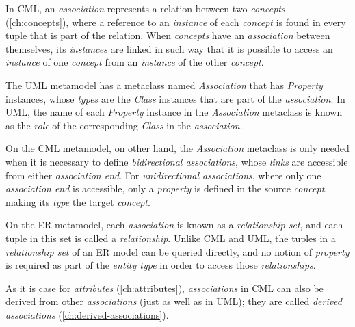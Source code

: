 In CML,
an \emph{association} represents a relation between two \emph{concepts} (\ref{ch:concepts}),
where a reference to an \emph{instance} of each \emph{concept} is found in every tuple that is part of the relation.
When \emph{concepts} have an \emph{association} between themselves,
its \emph{instances} are linked in such way that
it is possible to access an \emph{instance} of one \emph{concept}
from an \emph{instance} of the other \emph{concept}.

The UML \cite{uml} metamodel has a metaclass named \emph{Association} that has \emph{Property} instances,
whose \emph{types} are the \emph{Class} instances that are part of the \emph{association}.
In UML, the name of each \emph{Property} instance in the \emph{Association} metaclass
is known as the \emph{role} of the corresponding \emph{Class} in the \emph{association}.

On the CML metamodel, on other hand,
the \emph{Association} metaclass is only needed
when it is necessary to define \emph{bidirectional associations},
whose \emph{links} are accessible from either \emph{association end}.
For \emph{unidirectional associations},
where only one \emph{association end}  is accessible,
only a \emph{property} is defined in the source \emph{concept},
making its \emph{type} the target \emph{concept}.

On the ER \cite{er} metamodel,
each \emph{association} is known as a \emph{relationship set},
and each tuple in this set is called a \emph{relationship}.
Unlike CML and UML,
the tuples in a \emph{relationship set} of an ER model
can be queried directly,
and no notion of \emph{property} is required as part of the \emph{entity type}
in order to access those \emph{relationships}.

As it is case for \emph{attributes} (\ref{ch:attributes}),
\emph{associations} in CML can also be derived from other \emph{associations}
(just as well as in UML);
they are called \emph{derived associations} (\ref{ch:derived-associations}).


